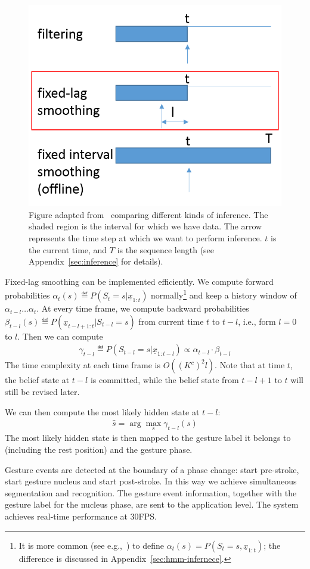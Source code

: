 \begin{figure}[tbh]
\centering
\includegraphics[width=0.5\columnwidth]{figures/inference.png}
\caption{Figure adapted from~\cite{murphy02} comparing different kinds of
inference. The shaded region is the interval for which we have data. The arrow
represents the time step at which we want to perform inference. $t$ is the
current time, and $T$ is the sequence length (see Appendix~\ref{sec:inference}
for details).}
\label{fig:inference}
\end{figure}

Fixed-lag smoothing can be implemented efficiently. We compute forward
probabilities $\alpha_t(s) \eqdef P(S_t = s|\underline{x}_{1:t})$
normally\footnote{It is more common (see e.g.,~\cite{Rabiner90}) to define
$\alpha_t(s) = P(S_t = s, \underline{x}_{1:t})$; the difference is discussed in
Appendix~\ref{sec:hmm-infernece}.} and keep a history window of
$\alpha_{t - l}\ldots\alpha_t$.
At every time frame, we compute backward probabilities $\beta_{t-l}(s)\eqdef
P(\underline{x}_{t-l+1:t}|S_{t-l}=s)$ from current time $t$ to $t - l$, i.e.,
form $l=0$ to $l$.
Then we can compute
\begin{align}
\gamma_{t - l} \eqdef P(S_{t-l}=s|\underline{x}_{1:t-l}) \propto \alpha_{t -
l}
\cdot
\beta_{t - l}
\end{align}  
The time complexity at each time frame is $O((K^c)^2l)$. Note that at time $t$,
the belief state at $t - l$ is committed, while the belief state from $t - l + 1$ to $t$
will still be revised later.

We can then compute the most likely hidden state at $t - l$:
\begin{align}
\hat{s} = \arg\max_s \gamma_{t - l}(s)
\end{align}
The most likely hidden state is then mapped to the gesture label it
belongs to (including the rest position) and the gesture phase. 

Gesture events are detected at the boundary of a phase change: start pre-stroke,
start gesture nucleus and start post-stroke. In this way
we achieve simultaneous segmentation and recognition. The gesture event
information, together with the gesture label for the nucleus phase, are sent to the application level.
The system achieves real-time performance at 30FPS.

